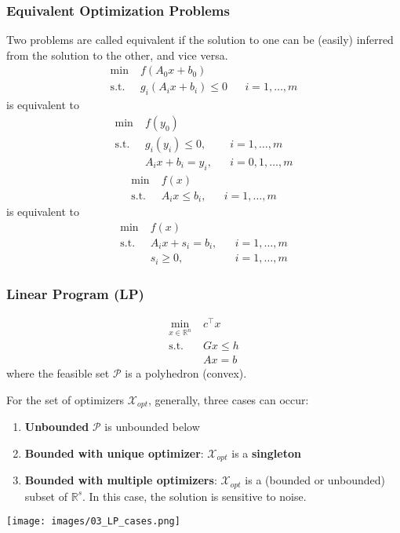 \subsubsection{Equivalent Optimization Problems}
Two problems are called equivalent if the solution to one can be (easily) inferred from the solution to the other, and vice versa.
\newpar{}
\begin{align*}
    \min\;           & f(A_0x + b_0)                               \\
    \mathrm{s.t.} \; & g_i(A_i x + b_i) \leq 0 &  & i = 1,\ldots,m
\end{align*}
is equivalent to
\begin{align*}
    \min\;          & f(y_0)                                   \\
    \mathrm{s.t.}\; & g_i(y_i) \leq 0,   &  & i = 1,\ldots,m   \\
                    & A_i x + b_i = y_i, &  & i = 0,1,\ldots,m
\end{align*}
\newpar{}
\begin{align*}
    \min\;          & f(x)                                \\
    \mathrm{s.t.}\; & A_i x \leq b_i, &  & i = 1,\ldots,m
\end{align*}
is equivalent to
\begin{align*}
    \min\;          & f(x)                                 \\
    \mathrm{s.t.}\; & A_i x +s_i= b_i, &  & i = 1,\ldots,m \\
                    & s_i \geq 0,      &  & i = 1,\ldots,m
\end{align*}

\subsubsection{Linear Program (LP)}
\begin{align*}
    \min_{x\in\mathbb{R}^n}\; & c^\top x  \\
    \mathrm{s.t.}\;           & Gx \leq h \\
                              & Ax = b
\end{align*}
where the feasible set $\mathcal{P}$ is a polyhedron (convex).

\newpar{}
For the set of optimizers $\mathcal{X}_{opt}$, generally, three cases can occur:
\begin{enumerate}
    \item \textbf{Unbounded} $\mathcal{P}$ is unbounded below
    \item \textbf{Bounded with unique optimizer}: $\mathcal{X}_{opt}$ is a \textbf{singleton}
    \item \textbf{Bounded with multiple optimizers}: $\mathcal{X}_{opt}$ is a (bounded or unbounded) subset of $\mathbb{R}^s$. In this case, the solution is sensitive to noise.       %
\end{enumerate}
\begin{center}
    \texttt{[image: images/03\_LP\_cases.png]}
\end{center}

